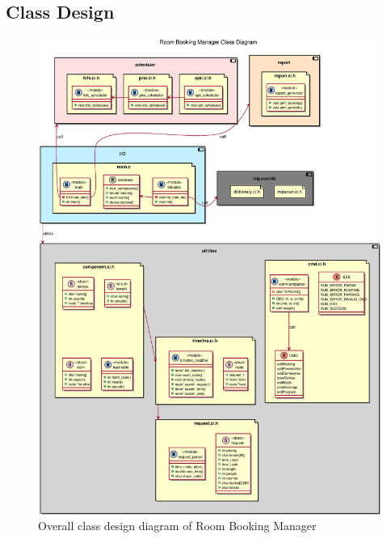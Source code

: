 \documentclass{article}
\begin{document}
        \subsection{Class Design}
            \begin{figure}[!htbp]
                \centering
                \includegraphics[scale=0.4]{eps/class_diagram.eps}
                \caption{Overall class design diagram of Room Booking Manager}
            \end{figure}
\end{document}

